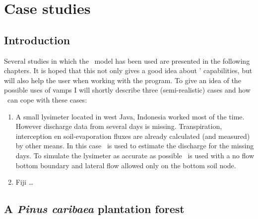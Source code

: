 
\part{Case studies}

\chapter{Introduction}
Several studies in which the \vamps\ model has been used are
presented in the following chapters. It is hoped that this
not only gives a good idea about \vamps{}' capabilities, but
will also help the user when working with the program.
To give an idea of the
possible uses of vamps I will shortly describe three (semi-realistic)
cases and how \vamps\ can cope with these cases:
\begin{enumerate}
\item
A small lysimeter located in west Java, Indonesia worked most of the
time. However discharge data from several days is
missing. Transpiration, interception en soil-evaporation fluxes are
already calculated (and measured) by other means. In this case \vamps\
is used to estimate the discharge for the missing days.
To simulate the lysimeter as accurate as possible \vamps\ is
used with a no flow bottom boundary and lateral flow allowed
only on the bottom soil node.
\item
Fiji \ldots
\end{enumerate}



\chapter{A {\em Pinus caribaea} plantation forest}\label{chap:fiji}
